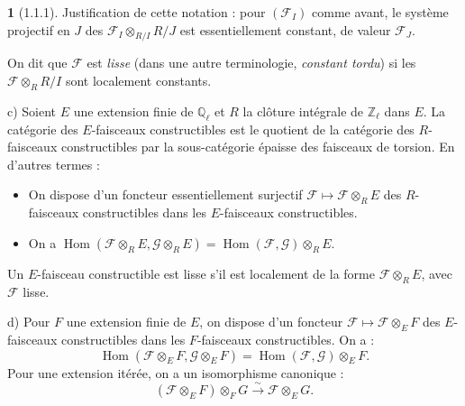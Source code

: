 \documentclass[12pt,a4paper]{article}
\theoremstyle{plain}
\theoremstyle{definition}
\theoremstyle{definition}
\newtheorem{para}{}[section]
\theoremstyle{remark}
\DeclareMathOperator{\Hom}{Hom}
\begin{document}
\begin{para}[1.1.1]
Justification de cette notation : pour $(\mathscr{F}_I)$ comme avant, le syst\`eme projectif en $J$ des $\mathscr{F}_I \otimes_{R/I} R/J$ est essentiellement constant, de valeur $\mathscr{F}_J$.

On dit que $\mathscr{F}$ est \emph{lisse} (dans une autre terminologie, \emph{constant tordu}) si les $\mathscr{F} \otimes_R R/I$ sont localement constants.

c) Soient $E$ une extension finie de $\mathbb{Q}_\ell$ et $R$ la cl\^oture int\'egrale de $\mathbb{Z}_\ell$ dans $E$. La cat\'egorie des $E$-faisceaux constructibles est le quotient de la cat\'egorie des $R$-faisceaux constructibles par la sous-cat\'egorie \'epaisse des faisceaux de torsion. En d'autres termes :
\begin{itemize}[nosep]
\item[$\alpha$)] On dispose d'un foncteur essentiellement surjectif $\mathscr{F} \mapsto \mathscr{F} \otimes_R E$ des $R$-faisceaux constructibles dans les $E$-faisceaux constructibles.
\item[$\beta$)] On a $\Hom(\mathscr{F} \otimes_R E, \mathscr{G} \otimes_R E) = \Hom(\mathscr{F}, \mathscr{G}) \otimes_R E$.
\end{itemize}

Un $E$-faisceau constructible est lisse s'il est localement de la forme $\mathscr{F} \otimes_R E$, avec $\mathscr{F}$ lisse.

d) Pour $F$ une extension finie de $E$, on dispose d'un foncteur $\mathscr{F} \mapsto \mathscr{F} \otimes_E F$ des $E$-faisceaux constructibles dans les $F$-faisceaux constructibles. On a :
\[\Hom(\mathscr{F} \otimes_E F, \mathscr{G} \otimes_E F) = \Hom(\mathscr{F}, \mathscr{G}) \otimes_E F.\]
Pour une extension it\'er\'ee, on a un isomorphisme canonique :
\begin{equation}\tag{1}
(\mathscr{F} \otimes_E F) \otimes_F G \xrightarrow{\sim} \mathscr{F} \otimes_E G.
\end{equation}


\end{para}
\end{document}
